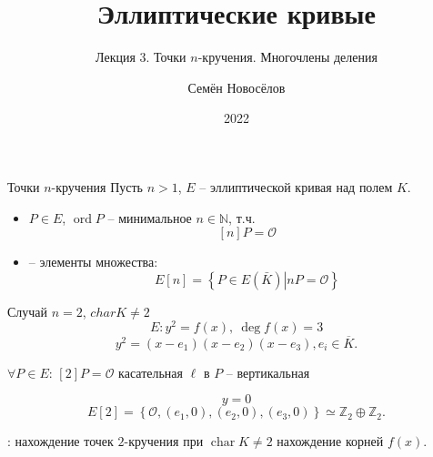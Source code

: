 \documentclass{beamer}
\title{Эллиптические кривые}
\subtitle{Лекция 3. Точки $n$-кручения. Многочлены деления}
\author{Семён Новосёлов}
\institute{БФУ им. И. Канта}
\date{2022}
\begin{document}
\frame{\titlepage}

\begin{frame}{Точки $n$-кручения}
Пусть $n > 1$, $E$ -- эллиптической кривая над полем $K$.
\begin{itemize}
    \item {} $P \in E$, $\operatorname{ord} P$ -- минимальное $n \in \mathbb{N}$, т.ч.
    \[
    [n] P = \mathcal{O}
    \]
    \item {} -- элементы множества:
    \[
    E[n] = \left\{ {\left. P \in E(\bar K)\right|nP = \mathcal{O}} \right\}
    \]
\end{itemize}
\end{frame}


\begin{frame}{Случай $n=2$, $charK \ne 2$}
\[
E: {y^2} = f(x), ~ \deg f\left( x \right) = 3
\]
\structure{\[\Downarrow\]}
\[
y^2 = \left( {x - {e_1}} \right)\left( {x - {e_2}} \right)\left( {x - {e_3}} \right), e_i \in \overline{K}.
\]
\begin{center}
$\forall P \in E$: $[2] P = \mathcal{O}$ \structure{$\Leftrightarrow$} касательная $\ell$ в $P$ -- вертикальная
\end{center}
\structure{\[\Downarrow\]}
\[
y = 0
\]
\structure{\[\Downarrow\]}
\[
E[2] = \left\{ \mathcal{O}, (e_1, 0), (e_2 ,0), (e_3,0) \right\} \simeq \mathbb{Z}_2 \oplus \mathbb{Z}_2.
\]
    
: нахождение точек $2$-кручения при $\operatorname{char}K \ne 2$ \structure{$\Leftrightarrow$} нахождение корней $f(x)$.
\end{frame}
\end{document}
